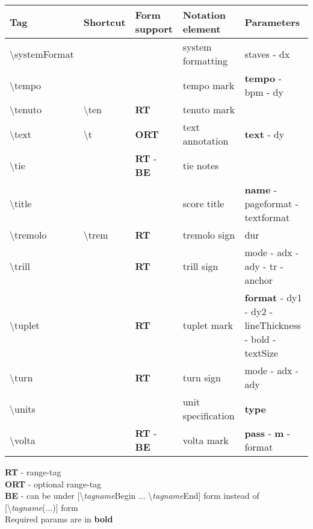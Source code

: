 \documentclass[a4paper, landscape, 10pt]{article}
\begin{document}
\begin{tabularx}{\linewidth}{p{3cm}p{4.5cm}p{3cm}p{5.5cm}l}
    \hline
    \textbf{Tag}&\textbf{Shortcut}&\textbf{Form support}&\textbf{Notation element}&\textbf{Parameters}\\
    \hline
    \textbackslash{}systemFormat&&&system formatting&staves - dx\\ %
    \hline
    \textbackslash{}tempo&&&tempo mark&\textbf{tempo} - bpm - dy\\
    \hline
    \textbackslash{}tenuto&\textbackslash{}ten&\textbf{RT}&tenuto mark&\\ %
    \hline
    \textbackslash{}text&\textbackslash{}t&\textbf{ORT}&text annotation&\textbf{text} - dy\\
    \hline
    \textbackslash{}tie&&\textbf{RT} - \textbf{BE}&tie notes&\\
    \hline
    \textbackslash{}title&&&score title&\textbf{name} - pageformat - textformat\\
    \hline
    \textbackslash{}tremolo&\textbackslash{}trem&\textbf{RT}&tremolo sign&dur\\
    \hline
    \textbackslash{}trill&&\textbf{RT}&trill sign&mode - adx - ady - tr - anchor\\
    \hline
    \textbackslash{}tuplet&&\textbf{RT}&tuplet mark&\textbf{format} - dy1 - dy2 - lineThickness - bold - textSize\\
    \hline
    \textbackslash{}turn&&\textbf{RT}&turn sign&mode - adx - ady\\
    \hline
    \textbackslash{}units&&&unit specification&\textbf{type}\\
    \hline
    \textbackslash{}volta&&\textbf{RT} - \textbf{BE}&volta mark&\textbf{pass} - \textbf{m} - format\\
    \hline
\end{tabularx}

\bigskip

\textbf{RT} - range-tag \\
\textbf{ORT} - optional range-tag \\
\textbf{BE} - can be under [\textbackslash{}\emph{tagname}Begin ... \textbackslash{}\emph{tagname}End] form instead of [\textbackslash{}\emph{tagname}(...)] form\\
Required params are in \textbf{bold}
\end{document}
